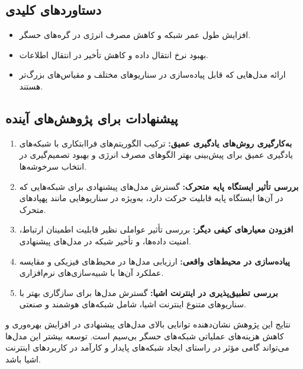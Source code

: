 \documentclass[12pt, onecolumn, a4paper]{article}
\begin{document}
\subsection*{دستاوردهای کلیدی}
\begin{itemize}
	\item افزایش طول عمر شبکه و کاهش مصرف انرژی در گره‌های حسگر.
	\item بهبود نرخ انتقال داده و کاهش تأخیر در انتقال اطلاعات.
	\item ارائه مدل‌هایی که قابل پیاده‌سازی در سناریوهای مختلف و مقیاس‌های بزرگ‌تر هستند.
\end{itemize}

\subsection*{پیشنهادات برای پژوهش‌های آینده}
\begin{enumerate}
	\item \textbf{به‌کارگیری روش‌های یادگیری عمیق:} ترکیب الگوریتم‌های فراابتکاری با شبکه‌های یادگیری عمیق برای پیش‌بینی بهتر الگوهای مصرف انرژی و بهبود تصمیم‌گیری در انتخاب سرخوشه‌ها.
	\item \textbf{بررسی تأثیر ایستگاه پایه متحرک:} گسترش مدل‌های پیشنهادی برای شبکه‌هایی که در آن‌ها ایستگاه پایه قابلیت حرکت دارد، به‌ویژه در سناریوهایی مانند پهپادهای متحرک.
	\item \textbf{افزودن معیارهای کیفی دیگر:} بررسی تأثیر عواملی نظیر قابلیت اطمینان ارتباط، امنیت داده‌ها، و تأخیر شبکه در مدل‌های پیشنهادی.
	\item\textbf{پیاده‌سازی در محیط‌های واقعی:} ارزیابی مدل‌ها در محیط‌های فیزیکی و مقایسه عملکرد آن‌ها با شبیه‌سازی‌های نرم‌افزاری.
	\item \textbf{بررسی تطبیق‌پذیری در اینترنت اشیا:} گسترش مدل‌ها برای سازگاری بهتر با سناریوهای متنوع اینترنت اشیا، شامل شبکه‌های هوشمند و صنعتی.
\end{enumerate}

نتایج این پژوهش نشان‌دهنده توانایی بالای مدل‌های پیشنهادی در افزایش بهره‌وری و کاهش هزینه‌های عملیاتی شبکه‌های حسگر بی‌سیم است. توسعه بیشتر این مدل‌ها می‌تواند گامی مؤثر در راستای ایجاد شبکه‌های پایدار و کارآمد در کاربردهای اینترنت اشیا باشد.

\renewcommand{\bibname}{مراجع} %
\end{document}
